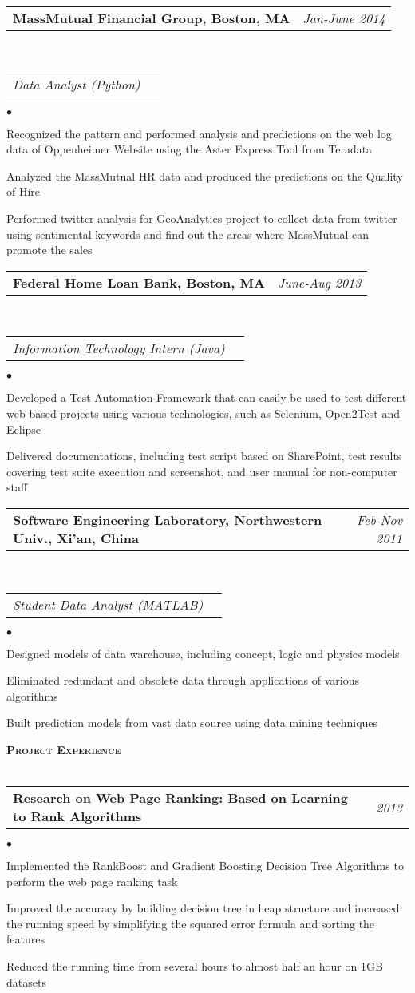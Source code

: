 \documentclass[11pt]{article}
\makeatletter
\newcommand{\lineunder}{\vspace*{-8pt} \\ \hspace*{-18pt} \hrulefill \\}
\newcommand{\header}[1]{{\hspace*{-15pt}\vspace*{6pt} \large \textsc{\textbf{#1}}} \vspace*{-6pt} \lineunder}
\newenvironment{achievements}{\begin{list}{$\bullet$}{\topsep 0pt \itemsep -2pt}}{\vspace*{4pt}\end{list}}
\newcommand{\headerrow}[2]
{\begin{tabular*}{\linewidth}{l@{\extracolsep{\fill}}r}
	\hspace*{-15pt}#1 & #2 \\
\end{tabular*}}
\newcommand{\headerrowww}[1]
{\begin{tabular*}{\linewidth}{l@{\extracolsep{\fill}}r}
	#1 &\\
\end{tabular*}}
\makeatother
\begin{document}
\headerrow
{\textbf{MassMutual Financial Group, Boston, MA}}
{\emph{Jan-June 2014}}
\\
\headerrowww
{\emph{Data Analyst (Python)}}
	\begin{achievements}
	\item Recognized the pattern and performed analysis and predictions on the web log data of Oppenheimer Website using the Aster Express Tool from Teradata
	\item Analyzed the MassMutual HR data and produced the predictions on the Quality of Hire
	\item Performed twitter analysis for GeoAnalytics project to collect data from twitter using sentimental keywords and find out the areas where MassMutual can promote the sales
	\end{achievements}
	

\headerrow
{\textbf{Federal Home Loan Bank, Boston, MA}}
{\emph{June-Aug 2013}}
\\
\headerrowww
{\emph{Information Technology Intern (Java)}}
	\begin{achievements}
	\item Developed a Test Automation Framework that can easily be used to test different web based projects 
	using various technologies, such as Selenium, Open2Test and Eclipse
	\item Delivered  documentations, including test script based on SharePoint, test results covering 
	test suite execution and screenshot, and user manual for non-computer staff 
	\end{achievements}
	
\headerrow
{\textbf{Software Engineering Laboratory, Northwestern Univ., Xi'an, China}}
{\emph{Feb-Nov 2011}}
\\
\headerrowww
{\emph{Student Data Analyst (MATLAB)}}
	\begin{achievements}
	\item Designed models of data warehouse, including concept, logic and physics models
	\item Eliminated redundant and obsolete data through applications of various algorithms
	\item Built prediction models from vast data source using data mining techniques
	\end{achievements}
	


\vspace*{2.5pt}
\header{Project Experience}
\headerrow
{\textbf{Research on Web Page Ranking: Based on Learning to Rank Algorithms}}
{\emph{2013}}
	\begin{achievements}
  \item Implemented the RankBoost and Gradient Boosting Decision Tree Algorithms to perform the web page ranking task
  \item Improved the accuracy by building decision tree in heap structure and increased the running speed by simplifying the squared error formula and sorting the features
  \item Reduced the running time from several hours to almost half an hour on 1GB datasets
  \end{achievements}
  
\end{document}
